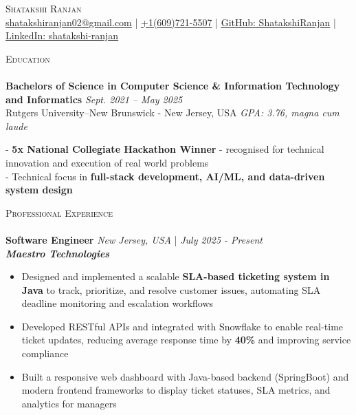 \documentclass[a4paper]{article}
\newcommand{\lineunder} {
    \vspace*{-8pt} \\
    \hspace*{-18pt} \hrulefill \\
}
\newcommand{\header} [1] {
    {\hspace*{-18pt}\vspace*{6pt} \textsc{#1}}
    \vspace*{-6pt} \lineunder
}
\begin{document}
\vspace*{-35pt}

\begin{center}
{\Large \scshape Shatakshi Ranjan}\\
\vspace{2pt}
\small{ \href{mailto:shatakshiranjan02@gmail.com}{shatakshiranjan02@gmail.com}  | \href{tel:6097215507}{+1(609)721-5507} | \href{https://github.com/ShatakshiRanjan}{GitHub: ShatakshiRanjan}  | \href{https://www.linkedin.com/in/shatakshi-ranjan/}{LinkedIn: shatakshi-ranjan}}\\
\end{center}
\vspace{-4pt} 

%
%
\header{Education}
\textbf{Bachelors of Science in Computer Science \& Information Technology and Informatics} \hfill \textit{Sept. 2021 – May 2025} \\
Rutgers University–New Brunswick - New Jersey, USA \hfill \textit{GPA: 3.76, magna cum laude}

  \vspace{1mm}
  - \textbf{5x National Collegiate Hackathon Winner} - recognised for technical innovation and execution of real world problems \\
  - Technical focus in \textbf{full-stack development, AI/ML, and data-driven system design}  \\

  \vspace{1mm}
%
%
\header{Professional Experience}

\textbf{Software Engineer} \hfill \textit{New Jersey, USA} | \textit{July 2025 - Present} \\
\textit{\textbf{Maestro Technologies}}
\vspace{-2.5mm}
\begin{itemize} \itemsep -4pt
    \item Designed and implemented a scalable \textbf{SLA-based ticketing system in Java} to track, prioritize, and resolve customer issues, automating SLA deadline monitoring and escalation workflows 
    \item Developed RESTful APIs and integrated with Snowflake to enable real-time ticket updates, reducing average response time by \textbf{40\%} and improving service compliance 
    \item Built a responsive web dashboard with Java-based backend (SpringBoot) and modern frontend frameworks to display ticket statuses, SLA metrics, and analytics for managers 
\end{itemize}
\vspace{-2mm}
\end{document}
